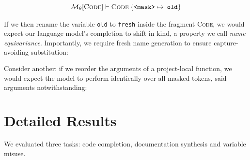 \documentclass[usenames,dvipsnames]{article} %
\begin{document}
  \begin{equation}
    \mathcal{M}_\theta[\textsc{Code}] \vdash \textsc{Code}\:\{\texttt{<mask>} \mapsto \:\texttt{old}\}
  \end{equation}

  If we then rename the variable \texttt{old} to \texttt{fresh} inside the fragment \textsc{Code}, we would expect our language model's completion to shift in kind, a property we call \textit{name equivariance}. Importantly, we require fresh name generation to ensure capture-avoiding substitution:

  \begin{center}
    \begin{prooftree}
    \end{prooftree}
  \end{center}

  Consider another: if we reorder the arguments of a project-local function, we would expect the model to perform identically over all masked tokens, said arguments notwithstanding:

  \begin{center}
    \begin{prooftree}
    \end{prooftree}
  \end{center}

  \pagebreak\section{Detailed Results}\label{sec:detailed_results}

  We evaluated three tasks: code completion, documentation synthesis and variable misuse.
\end{document}
